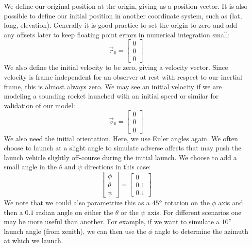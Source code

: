 \documentclass[12pt]{report}
\begin{document}
We define our original position at the origin, giving us a position vector. It is also possible to define our initial position in another coordinate system, such as (lat, long, elevation). Generally it is good practice to set the origin to zero and add any offsets later to keep floating point errors in numerical integration small:
$$\vec{r}_0=\begin{bmatrix}
    0\\0\\0
\end{bmatrix}$$
We also define the initial velocity to be zero, giving a velocity vector. Since velocity is frame independent for an observer at rest with respect to our inertial frame, this is almost always zero. We may see an initial velocity if we are modeling a sounding rocket launched with an initial speed or similar for validation of our model:
$$\vec{v}_0=\begin{bmatrix}
    0\\0\\0
\end{bmatrix}$$
We also need the initial orientation. Here, we use \gls{Euler angles} again. We often choose to launch at a slight angle to simulate adverse affects that may push the launch vehicle slightly off-course during the initial launch. We choose to add a small angle in the $\theta$ and $\psi$ directions in this case:
\begin{equation}\label{eq: euler angles 6DoF}
    \begin{bmatrix}
    \phi\\\theta\\\psi
\end{bmatrix} =
\begin{bmatrix}
    0\\0.1\\0.1
\end{bmatrix}
\end{equation}
We note that we could also parametrize this as a $45\degree$ rotation on the $\phi$ axis and then a $0.1$ radian angle on either the $\theta$ or the $\psi$ axis. For different scenarios one may be more useful than another. For example, if we want to simulate a $10\degree$ launch angle (from zenith), we can then use the $\phi$ angle to determine the azimuth at which we launch.
\end{document}
